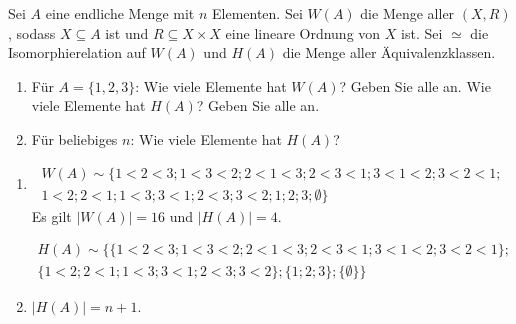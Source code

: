 
\begin{exercise}[281]

Sei $A$ eine endliche Menge mit $n$ Elementen. Sei $W(A)$ die Menge aller $(X,R)$,
sodass $X \subseteq A$ ist und $R \subseteq X \times X$ eine lineare Ordnung von $X$
ist. Sei $\simeq$ die Isomorphierelation auf $W(A)$ und $H(A)$ die Menge aller
Äquivalenzklassen.

\begin{enumerate}[label = \alph*.]
  \item Für $A = \{1,2,3\}$: Wie viele Elemente hat $W(A)$? Geben Sie alle an.
  Wie viele Elemente hat $H(A)$? Geben Sie alle an.
  \item Für beliebiges $n$: Wie viele Elemente hat $H(A)$?
\end{enumerate}

\end{exercise}


\begin{solution}

\phantom{}

\begin{enumerate}[label = \alph*.]
  \item
  \begin{align*}
    W(A)
    \sim \{ 1 < 2 < 3; 1 < 3 < 2; 2 < 1 < 3; 2 < 3 < 1;
    3 < 1 < 2; 3 < 2 < 1; \\
    1 < 2; 2 < 1; 1 < 3; 3 < 1; 2 < 3;
    3 < 2; 1; 2 ; 3 ; \emptyset\}
  \end{align*}
  Es gilt $|W(A)| = 16$ und $|H(A)| = 4$.

  \begin{align*}
    H(A) \sim \{\{1 < 2 < 3; 1 < 3 < 2; 2 < 1 < 3; 2 < 3 < 1;
    3 < 1 < 2; 3 < 2 < 1\}; \\
    \{1 < 2; 2 < 1; 1 < 3; 3 < 1; 2 < 3;
    3 < 2\};\{1; 2 ; 3\};\{\emptyset\}\}
  \end{align*}
  \item $|H(A)| = n + 1$.
\end{enumerate}

\end{solution}

